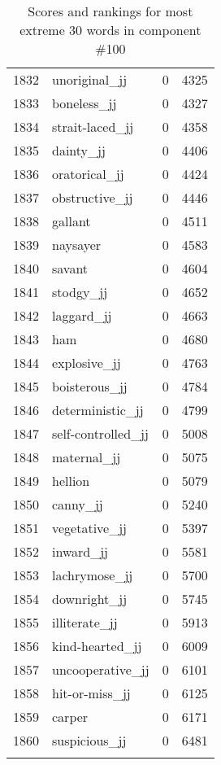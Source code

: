 \begin{longtable}[!htbp]{| rlr@{.}l |}
    1832 & unoriginal\_jj & 0 & 4325 \\
    1833 & boneless\_jj & 0 & 4327 \\
    1834 & strait-laced\_jj & 0 & 4358 \\
    1835 & dainty\_jj & 0 & 4406 \\
    1836 & oratorical\_jj & 0 & 4424 \\
    1837 & obstructive\_jj & 0 & 4446 \\
    1838 & gallant & 0 & 4511 \\
    1839 & naysayer & 0 & 4583 \\
    1840 & savant & 0 & 4604 \\
    1841 & stodgy\_jj & 0 & 4652 \\
    1842 & laggard\_jj & 0 & 4663 \\
    1843 & ham & 0 & 4680 \\
    1844 & explosive\_jj & 0 & 4763 \\
    1845 & boisterous\_jj & 0 & 4784 \\
    1846 & deterministic\_jj & 0 & 4799 \\
    1847 & self-controlled\_jj & 0 & 5008 \\
    1848 & maternal\_jj & 0 & 5075 \\
    1849 & hellion & 0 & 5079 \\
    1850 & canny\_jj & 0 & 5240 \\
    1851 & vegetative\_jj & 0 & 5397 \\
    1852 & inward\_jj & 0 & 5581 \\
    1853 & lachrymose\_jj & 0 & 5700 \\
    1854 & downright\_jj & 0 & 5745 \\
    1855 & illiterate\_jj & 0 & 5913 \\
    1856 & kind-hearted\_jj & 0 & 6009 \\
    1857 & uncooperative\_jj & 0 & 6101 \\
    1858 & hit-or-miss\_jj & 0 & 6125 \\
    1859 & carper & 0 & 6171 \\
    1860 & suspicious\_jj & 0 & 6481 \\
    \hline
    \caption{Scores and rankings for most extreme 30 words in component \#100} \\
\end{longtable}
